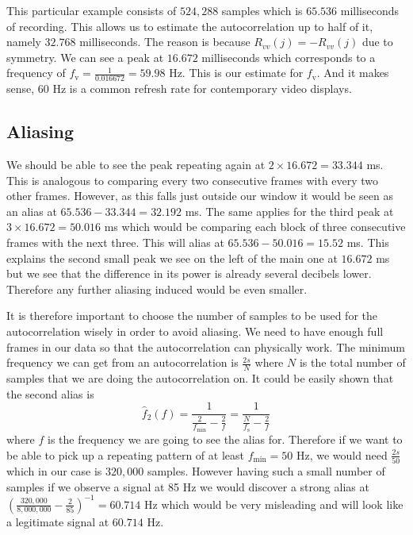 \documentclass[a4paper,12pt,twoside,openright]{report}
\begin{document}
This particular example consists of $524,288$ samples which is $65.536$ milliseconds of recording. This allows us to estimate the autocorrelation up to half of it, namely $32.768$ milliseconds. The reason is because $R_{vv}(j)=-R_{vv}(j)$ due to symmetry. We can see a peak at $16.672$ milliseconds which corresponds to a frequency of $f_\text{v} = \frac{1}{0.016672} = 59.98$ Hz. This is our estimate for $f_\text{v}$. And it makes sense, $60$ Hz is a common refresh rate for contemporary video displays.

\subsection{Aliasing}
We should be able to see the peak repeating again at $2 \times 16.672 = 33.344$ ms. This is analogous to comparing every two consecutive frames with every two other frames. However, as this falls just outside our window it would be seen as an alias at $65.536-33.344 = 32.192$ ms. The same applies for the third peak at $3 \times 16.672 = 50.016$ ms which would be comparing each block of three consecutive frames with the next three. This will alias at $65.536 - 50.016 = 15.52$ ms. This explains the second small peak we see on the left of the main one at $16.672$ ms but we see that the difference in its power is already several decibels lower. Therefore any further aliasing induced would be even smaller.

It is therefore important to choose the number of samples to be used for the autocorrelation wisely in order to avoid aliasing. We need to have enough full frames in our data so that the autocorrelation can physically work. The minimum frequency we can get from an autocorrelation is $\frac{2 s}{N}$ where $N$ is the total number of samples that we are doing the autocorrelation on. It could be easily shown that the second alias is
\begin{equation}
\hat{f}_{2}(f) = \frac{1}{\frac{2}{f_\text{min}}-\frac{2}{f}} = \frac{1}{\frac{N}{f_\text{s}}-\frac{2}{f}}
\end{equation}
where $f$ is the frequency we are going to see the alias for. Therefore if we want to be able to pick up a repeating pattern of at least $f_\text{min} = 50$ Hz, we would need $\frac{2 s}{50}$ which in our case is $320,000$ samples. However having such a small number of samples if we observe a signal at 85 Hz we would discover a strong alias at $\left( \frac{320,000}{8,000,000}-\frac{2}{85} \right)^{-1} = 60.714$ Hz which would be very misleading and will look like a legitimate signal at $60.714$ Hz. 
\end{document}
